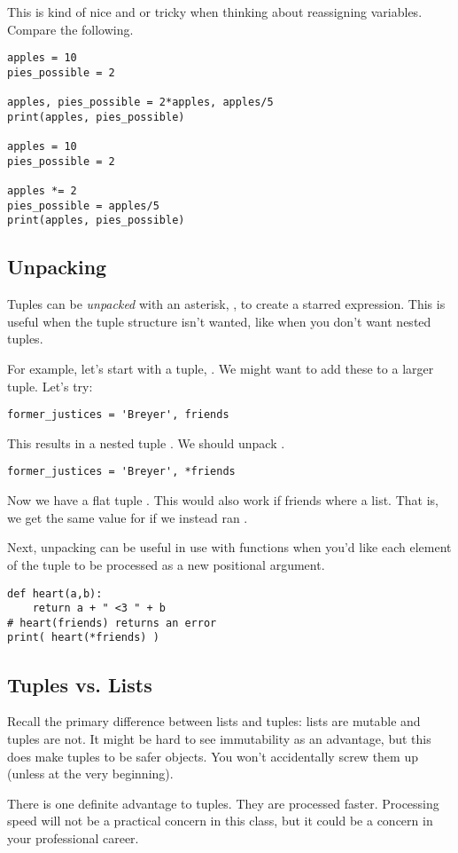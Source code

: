 \noindent This is kind of nice and or tricky when thinking about reassigning variables. Compare the following.

\begin{lstlisting}
apples = 10
pies_possible = 2

apples, pies_possible = 2*apples, apples/5
print(apples, pies_possible)

apples = 10
pies_possible = 2

apples *= 2
pies_possible = apples/5
print(apples, pies_possible)
\end{lstlisting}

\subsection{Unpacking}

Tuples can be \emph{unpacked} with an asterisk, \code{*}, to create a starred expression. This is useful when the tuple structure isn't wanted, like when you don't want nested tuples. 

For example, let's start with a tuple, . We might want to add these to a larger tuple. Let's try: 

\begin{lstlisting}
former_justices = 'Breyer', friends
\end{lstlisting}

This results in a nested tuple . We should unpack .

\begin{lstlisting}
former_justices = 'Breyer', *friends
\end{lstlisting}

Now we have a flat tuple . This would also work if friends where a list. That is, we get the same value for  if we instead ran .

Next, unpacking can be useful in use with functions when you'd like each element of the tuple to be processed as a new positional argument.

\begin{lstlisting}
def heart(a,b):
    return a + " <3 " + b
# heart(friends) returns an error
print( heart(*friends) )
\end{lstlisting}

\subsection{Tuples vs. Lists}

Recall the primary difference between lists and tuples: lists are mutable and tuples are not. It might be hard to see immutability as an advantage, but this does make tuples to be safer objects. You won't accidentally screw them up (unless at the very beginning).

There is one definite advantage to tuples. They are processed faster. Processing speed will not be a practical concern in this class, but it could be a concern in your professional career. 